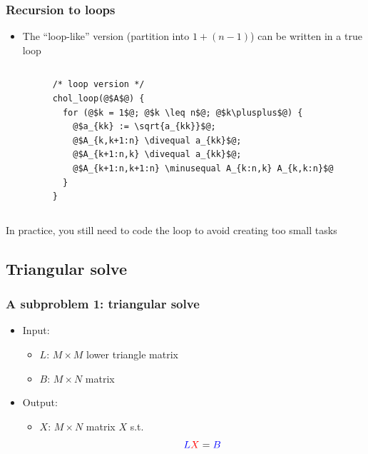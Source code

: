 \documentclass[12pt,dvipdfmx]{beamer}
\newcommand{\minusequal}{\mbox{\tt\ -= }}
\newcommand{\divequal}{\mbox{\tt\ /= }}
\newcommand{\plusplus}{\mbox{\tt\ ++ }}
\newcommand{\ao}[1]{{\color{blue}#1}}
\newcommand{\aka}[1]{{\color{red}#1}}
\begin{document}
\begin{frame}[fragile]
\frametitle{Recursion to loops}

\begin{itemize}
\item The ``loop-like'' version 
  (partition into $1 + (n - 1)$)
  can be written in a true loop
\end{itemize}

\begin{columns}[t]
\begin{column}{0.5\textwidth}
\begin{center}
\def\svgwidth{0.6\textwidth}
%
\only<2>{}%
\only<3>{}%
\only<4>{}%
\only<5>{}%
%
%
\end{center}
\end{column}

\begin{column}{0.5\textwidth}
\begin{lstlisting}[basicstyle=\scriptsize]
/* loop version */
chol_loop(@$A$@) {
  for (@$k = 1$@; @$k \leq n$@; @$k\plusplus$@) {
    @$a_{kk} := \sqrt{a_{kk}}$@;
    @$A_{k,k+1:n} \divequal a_{kk}$@;
    @$A_{k+1:n,k} \divequal a_{kk}$@;
    @$A_{k+1:n,k+1:n} \minusequal A_{k:n,k} A_{k,k:n}$@
  }
}
\end{lstlisting}
\end{column}
\end{columns}

In practice, you still need to code the loop to
avoid creating too small tasks

\end{frame}


\subsection{Triangular solve}
\begin{frame}[fragile]
\frametitle{A subproblem 1: triangular solve}
\begin{itemize}
\item Input: 
  \begin{itemize}
  \item \ao{$L$}: $M\times M$ lower triangle matrix
  \item \ao{$B$}: $M\times N$ matrix
  \end{itemize}
\item Output:
  \begin{itemize}
  \item \aka{$X$}: $M\times N$ matrix $X$ s.t. 
    \[ \ao{L} \aka{X} = \ao{B} \]
  \end{itemize}
\end{itemize}

\begin{center}
\def\svgwidth{0.6\textwidth}

\end{center}
\end{frame}
\end{document}
